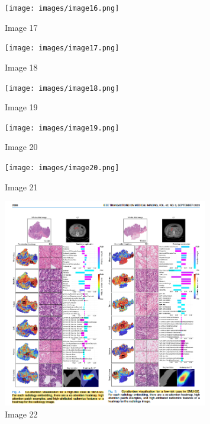 \documentclass{article}%
\begin{document}
%


\begin{figure}[h!]%
\centering%
\texttt{[image: images/image16.png]}%
\caption{Image 17}%
\end{figure}

%


\begin{figure}[h!]%
\centering%
\texttt{[image: images/image17.png]}%
\caption{Image 18}%
\end{figure}

%


\begin{figure}[h!]%
\centering%
\texttt{[image: images/image18.png]}%
\caption{Image 19}%
\end{figure}

%


\begin{figure}[h!]%
\centering%
\texttt{[image: images/image19.png]}%
\caption{Image 20}%
\end{figure}

%


\begin{figure}[h!]%
\centering%
\texttt{[image: images/image20.png]}%
\caption{Image 21}%
\end{figure}

%


\begin{figure}[h!]%
\centering%
\includegraphics[width=0.8\textwidth]{images/image21.png}%
\caption{Image 22}%
\end{figure}
\end{document}
